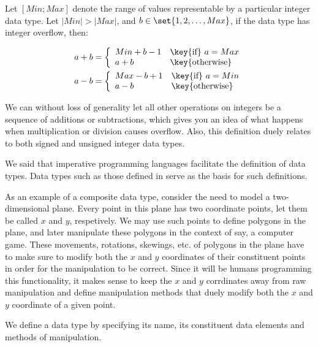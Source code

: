 \begin{definition}

Let $[Min;Max]$ denote the range of values representable by a particular
integer data type. Let $|Min|>|Max|$, and $b\in\set{1,2,\ldots,Max}$, if the
data type has integer overflow, then:

\begin{align}
a+b=\left\{
\begin{array}{ll}
Min+b-1&\text{\key{if}}\ a=Max\\
a+b&\text{\key{otherwise}}
\end{array}\right.\\
a-b=\left\{
\begin{array}{ll}
Max-b+1&\text{\key{if}}\ a=Min\\
a-b&\text{\key{otherwise}}
\end{array}\right.\\
\end{align}

\end{definition}

We can without loss of generality let all other operations on integers be a
sequence of additions or subtractions, which gives you an idea of what happens
when multiplication or division causes overflow. Also, this definition duely
relates to both signed and unsigned integer data types.

We said that imperative programming languages facilitate the definition of data
types. Data types such as those defined in 
serve as the basis for such definitions.

As an example of a composite data type, consider the need to model a
two-dimensional plane. Every point in this plane has two coordinate points, let
them be called $x$ and $y$, respetively. We may use such points to define
polygons in the plane, and later manipulate these polygons in the context of
say, a computer game. These movements, rotations, skewings, etc. of polygons in
the plane have to make sure to modify both the $x$ and $y$ coordinates of their
constituent points in order for the manipulation to be correct. Since it will
be humans programming this functionality, it makes sense to keep the $x$ and
$y$ corrdinates away from raw manipulation and define manipulation methods that
duely modify both the $x$ and $y$ coordinate of a given point.

\begin{definition}

We define a data type by specifying its name, its constituent data elements and
methods of manipulation.

\end{definition}

